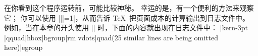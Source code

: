 \ddanger 在你看到这个程序运转前，可能比较神秘。
幸运的是，有一个便利的方法来观察它；
你可以使用 |\tracingpages||=1|，从而告诉 \TeX\ 把页面成本的计算输出到日志文件中。
例如，当在本章的开头使用 || 时，下面的内容就出现在日志文件中：
\begintt
|kern-3pt
|qquad|hbox|bgroup|rm|vdots|quad(25 similar lines are being omitted here)|egroup
